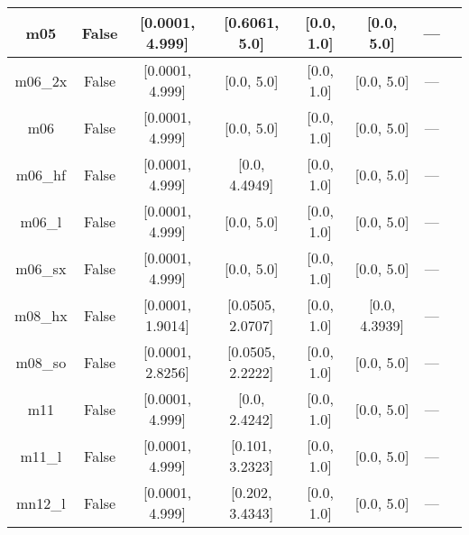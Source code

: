\begin{tabular}{|c|c|c|c|c|c|c|l|}
          m05 &                 False &  [0.0001, 4.999] &    [0.6061, 5.0] &    [0.0, 1.0] &     [0.0, 5.0] &        --- &                                                             \cite{Zhao2005_161103} \\ \hline
      m06\_2x &                 False &  [0.0001, 4.999] &       [0.0, 5.0] &    [0.0, 1.0] &     [0.0, 5.0] &        --- &                                                                \cite{Zhao2008_215} \\ \hline
          m06 &                 False &  [0.0001, 4.999] &       [0.0, 5.0] &    [0.0, 1.0] &     [0.0, 5.0] &        --- &                                                                \cite{Zhao2008_215} \\ \hline
      m06\_hf &                 False &  [0.0001, 4.999] &    [0.0, 4.4949] &    [0.0, 1.0] &     [0.0, 5.0] &        --- &                                                              \cite{Zhao2006_13126} \\ \hline
       m06\_l &                 False &  [0.0001, 4.999] &       [0.0, 5.0] &    [0.0, 1.0] &     [0.0, 5.0] &        --- &                                                \cite{Zhao2006_194101,Zhao2008_215} \\ \hline
      m06\_sx &                 False &  [0.0001, 4.999] &       [0.0, 5.0] &    [0.0, 1.0] &     [0.0, 5.0] &        --- &                                                               \cite{Wang2020_2294} \\ \hline
      m08\_hx &                 False & [0.0001, 1.9014] & [0.0505, 2.0707] &    [0.0, 1.0] &  [0.0, 4.3939] &        --- &                                                               \cite{Zhao2008_1849} \\ \hline
      m08\_so &                 False & [0.0001, 2.8256] & [0.0505, 2.2222] &    [0.0, 1.0] &     [0.0, 5.0] &        --- &                                                               \cite{Zhao2008_1849} \\ \hline
          m11 &                 False &  [0.0001, 4.999] &    [0.0, 2.4242] &    [0.0, 1.0] &     [0.0, 5.0] &        --- &                                                           \cite{Peverati2011_2810} \\ \hline
       m11\_l &                 False &  [0.0001, 4.999] &  [0.101, 3.2323] &    [0.0, 1.0] &     [0.0, 5.0] &        --- &                                                            \cite{Peverati2012_117} \\ \hline
      mn12\_l &                 False &  [0.0001, 4.999] &  [0.202, 3.4343] &    [0.0, 1.0] &     [0.0, 5.0] &        --- &                                                          \cite{Peverati2012_13171} \\ \hline

\end{tabular}
